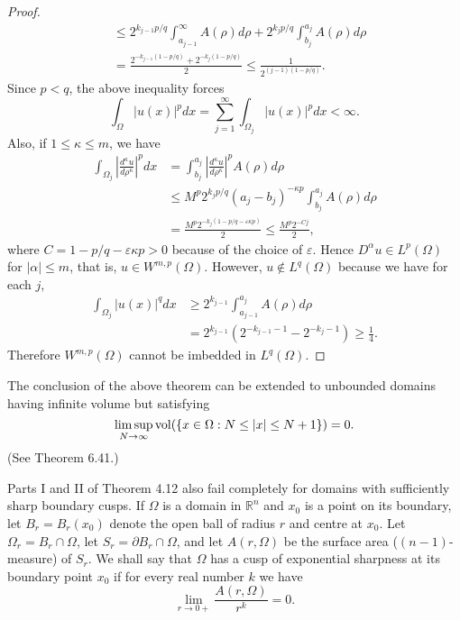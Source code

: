 \begin{proof}
\[\begin{aligned}
  & \leq 2^{k_{j-1} p / q} \int_{a_{j-1}}^{\infty} A(\rho) d \rho+2^{k_j p / q} \int_{b_j}^{a_j} A(\rho) d \rho \\
  & =\frac{2^{-k_{j-1}(1-p / q)}+2^{-k_j(1-p / q)}}{2} \leq \frac{1}{2^{(j-1)(1-p / q)}} .
  \end{aligned}
  \]
  Since $p<q$, the above inequality forces
  \[
  \int_{\Omega}|u(x)|^p d x=\sum_{j=1}^{\infty} \int_{\Omega_j}|u(x)|^p d x<\infty .
  \]
  Also, if $1 \leq \kappa \leq m$, we have
  \[
  \begin{aligned}
  \int_{\Omega_j}\left|\frac{d^\kappa u}{d \rho^\kappa}\right|^p d x & =\int_{b_j}^{a_j}\left|\frac{d^\kappa u}{d \rho^\kappa}\right|^p A(\rho) d \rho \\
  & \leq M^p 2^{k_j p / q}\left(a_j-b_j\right)^{-\kappa p} \int_{b_j}^{a_j} A(\rho) d \rho \\
  & =\frac{M^p 2^{-k_j(1-p / q-\varepsilon \kappa p)}}{2} \leq \frac{M^p 2^{-C j}}{2},
  \end{aligned}
  \]
  where $C=1-p / q-\varepsilon \kappa p>0$ because of the choice of $\varepsilon$. Hence $D^\alpha u \in L^p(\Omega)$ for $|\alpha| \leq m$, that is, $u \in W^{m, p}(\Omega)$. However, $u \notin L^q(\Omega)$ because we have for each $j$,
  \[
  \begin{aligned}
  \int_{\Omega_j}|u(x)|^q d x & \geq 2^{k_{j-1}} \int_{a_{j-1}}^{a_j} A(\rho) d \rho \\
  & =2^{k_{j-1}}\left(2^{-k_{j-1}-1}-2^{-k_j-1}\right) \geq \frac{1}{4} .
  \end{aligned}
  \]
  Therefore $W^{m,p}(\Omega)$ cannot be imbedded in $L^q(\Omega)$.
\end{proof}

The conclusion of the above theorem can be extended to unbounded domains having infinite volume but satisfying
\[\limsup_{N \rightarrow \infty} \operatorname{vol}(\{x \in \Omega: N \leq|x| \leq N+1\})=0.\]
(See Theorem 6.41.)

\begin{para}
  Parts I and II of Theorem 4.12 also fail completely for domains with sufficiently sharp boundary cusps. 
  If $\Omega$ is a domain in $\mathbb{R}^n$ and $x_0$ is a point on its boundary,
  let $B_r=B_r\left(x_0\right)$ denote the open ball of radius $r$ and centre at $x_0$.
  Let $\Omega_r=B_r \cap \Omega$, let $S_r = \partial B_r \cap \Omega$,
  and let $A(r, \Omega)$ be the surface area ($(n-1)$-measure) of $S_r$.
  We shall say that $\Omega$ has a cusp of exponential sharpness
  at its boundary point $x_0$ if for every real number $k$ we have
  \begin{equation}\label{eq:4.25}
    \lim_{r\to 0+} \frac{A(r, \Omega)}{r^k} = 0.
  \end{equation}
\end{para}

